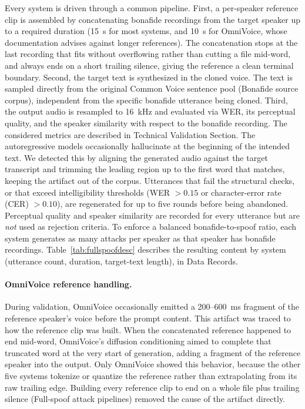 \documentclass[11pt]{article}
\begin{document}
Every system is driven through a common pipeline. First, a per-speaker
reference clip is assembled by concatenating  bonafide
recordings from the target speaker up to a required duration (\SI{15}{\second} for most systems, and \SI{10}{\second} for OmniVoice, whose documentation
advises against longer references). The concatenation stops at the last
recording that fits without overflowing rather than cutting a
file mid-word, and always ends on a short trailing silence, giving the
reference a clean terminal boundary. Second, the target text is
synthesized in the cloned voice. The text is sampled directly from the
original Common Voice sentence pool (Bonafide source corpus),
independent from the specific bonafide utterance being cloned. 
Third, the output audio is resampled to \SI{16}{\kilo\hertz} and evaluated via WER, its perceptual quality, and the speaker similarity with respect to the bonafide recording. The considered metrics are described in Technical Validation Section. 
The autoregressive models occasionally hallucinate at the beginning of the intended text. We detected this by
aligning the generated audio against the target transcript and
trimming the leading region up to the first word that matches, keeping
the artifact out of the corpus. Utterances that fail the structural
checks, or that exceed intelligibility thresholds
(WER $>0.15$ or character-error rate (CER) $>0.10$), are
regenerated for up to five rounds before being abandoned. Perceptual
quality and speaker similarity are recorded for every utterance but are \emph{not} used as rejection criteria. 
To enforce a balanced bonafide-to-spoof ratio, each
system generates as many attacks per speaker as that speaker has
bonafide recordings.
Table~\ref{tab:fullspoofdesc} describes the resulting content by system
(utterance count, duration, target-text length), in Data Records.

\paragraph{OmniVoice reference handling.} During validation,
OmniVoice occasionally emitted a 200--\SI{600}{\milli\second} fragment of
the reference speaker's voice before the prompt content. This artifact
was traced to how the reference clip was built. When the concatenated
reference happened to end mid-word, OmniVoice's diffusion conditioning
aimed to complete that truncated word at the very start of generation,
adding a fragment of the reference speaker into the output. Only
OmniVoice showed this behavior, because the other five systems tokenize
or quantize the reference rather than extrapolating from its raw
trailing edge. Building every reference clip to end on a whole file plus
trailing silence (Full-spoof attack pipelines) removed the cause of the
artifact directly.
\end{document}
